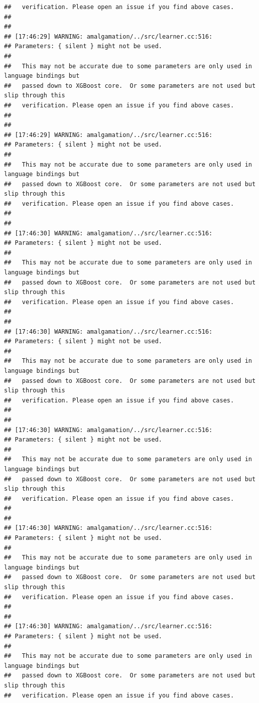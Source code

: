 \documentclass[AMS,STIX2COL]{WileyNJD-v2}\usepackage[]{graphicx}\usepackage[]{color}
\makeatletter
\newenvironment{kframe}{%
 \def\at@end@of@kframe{}%
 \ifinner\ifhmode%
  \def\at@end@of@kframe{\end{minipage}}%
  \begin{minipage}{\columnwidth}%
 \fi\fi%
 \def\FrameCommand##1{\hskip\@totalleftmargin \hskip-\fboxsep
 \colorbox{shadecolor}{##1}\hskip-\fboxsep
     \hskip-\linewidth \hskip-\@totalleftmargin \hskip\columnwidth}%
 \MakeFramed {\advance\hsize-\width
   \@totalleftmargin\z@ \linewidth\hsize
   \@setminipage}}%
 {\par\unskip\endMakeFramed%
 \at@end@of@kframe}
\newenvironment{knitrout}{}{} %
\makeatother
\begin{document}
\begin{knitrout}
\begin{kframe}
\begin{verbatim}
##   verification. Please open an issue if you find above cases.
## 
## 
## [17:46:29] WARNING: amalgamation/../src/learner.cc:516: 
## Parameters: { silent } might not be used.
## 
##   This may not be accurate due to some parameters are only used in language bindings but
##   passed down to XGBoost core.  Or some parameters are not used but slip through this
##   verification. Please open an issue if you find above cases.
## 
## 
## [17:46:29] WARNING: amalgamation/../src/learner.cc:516: 
## Parameters: { silent } might not be used.
## 
##   This may not be accurate due to some parameters are only used in language bindings but
##   passed down to XGBoost core.  Or some parameters are not used but slip through this
##   verification. Please open an issue if you find above cases.
## 
## 
## [17:46:30] WARNING: amalgamation/../src/learner.cc:516: 
## Parameters: { silent } might not be used.
## 
##   This may not be accurate due to some parameters are only used in language bindings but
##   passed down to XGBoost core.  Or some parameters are not used but slip through this
##   verification. Please open an issue if you find above cases.
## 
## 
## [17:46:30] WARNING: amalgamation/../src/learner.cc:516: 
## Parameters: { silent } might not be used.
## 
##   This may not be accurate due to some parameters are only used in language bindings but
##   passed down to XGBoost core.  Or some parameters are not used but slip through this
##   verification. Please open an issue if you find above cases.
## 
## 
## [17:46:30] WARNING: amalgamation/../src/learner.cc:516: 
## Parameters: { silent } might not be used.
## 
##   This may not be accurate due to some parameters are only used in language bindings but
##   passed down to XGBoost core.  Or some parameters are not used but slip through this
##   verification. Please open an issue if you find above cases.
## 
## 
## [17:46:30] WARNING: amalgamation/../src/learner.cc:516: 
## Parameters: { silent } might not be used.
## 
##   This may not be accurate due to some parameters are only used in language bindings but
##   passed down to XGBoost core.  Or some parameters are not used but slip through this
##   verification. Please open an issue if you find above cases.
## 
## 
## [17:46:30] WARNING: amalgamation/../src/learner.cc:516: 
## Parameters: { silent } might not be used.
## 
##   This may not be accurate due to some parameters are only used in language bindings but
##   passed down to XGBoost core.  Or some parameters are not used but slip through this
##   verification. Please open an issue if you find above cases.

\end{verbatim}
\end{kframe}
\end{knitrout}
\end{document}
